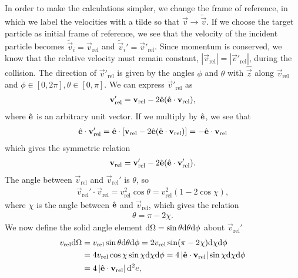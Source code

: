 In order to make the calculations simpler, we change the frame of reference, in which we label the velocities with a tilde so that $\vec v \rightarrow \tilde{\vec v}$. If we choose the target particle as initial frame of reference, we see that the velocity of the incident particle becomes $\tilde {\vec v}_i = \vec v_\text{rel}$ and $\tilde {\vec v}_i' = \vec v'_\text{rel}$. Since momentum is conserved, we know that the relative velocity must remain constant, $|\vec v_\text{rel}| = |\vec v'_\text{rel}|$, during the collision. The direction of $\vec v'_\text{rel}$ is given by the angles $\phi$ and $\theta$ with $\hat {\vec z}$ along $\vec v_\text{rel}$ and $\phi \in [0, 2\pi], \theta \in [0, \pi]$. We can express $\vec v'_\text{rel}$ as
\begin{align}
	\mathbf v_\text{rel}' = \mathbf v_\text{rel} - 2\hat {\mathbf{e}}(\hat {\mathbf{e}}\cdot\mathbf v_\text{rel}),
\end{align}
where $\hat {\mathbf{e}}$ is an arbitrary unit vector. If we multiply by $\hat {\mathbf{e}}$, we see that 
\begin{align}
	\hat {\mathbf{e}}\cdot \mathbf v_\text{rel}' = \hat {\mathbf{e}}\cdot\left[\mathbf v_\text{rel} - 2\hat {\mathbf{e}}(\hat {\mathbf{e}}\cdot\mathbf v_\text{rel})\right] = -\hat {\mathbf{e}} \cdot \mathbf v_\text{rel}
\end{align}
which gives the symmetric relation
\begin{align}
	\mathbf v_\text{rel} = \mathbf v_\text{rel}' - 2\hat {\mathbf{e}}(\hat {\mathbf{e}}\cdot\mathbf v_\text{rel}').
\end{align}
The angle between $\vec v_\text{rel}$ and $\vec v_\text{rel}'$ is $\theta$, so
\begin{align}
	\vec v_\text{rel}'\cdot \vec v_\text{rel} = v_\text{rel}^2\cos\theta = v_\text{rel}^2(1 - 2\cos \chi),
\end{align}
where $\chi$ is the angle between $\hat {\mathbf{e}}$ and $\vec v_\text{rel}$, which gives the relation
\begin{align}
	\theta = \pi - 2\chi.
\end{align}
We now define the solid angle element $\mathrm{d}\Omega=\sin\theta \mathrm{d}\theta \mathrm{d}\phi$ about $\vec v_\text{rel}'$ 
\begin{align}
	v_\text{rel} \mathrm{d}\Omega &= v_\text{rel}\sin\theta \mathrm{d}\theta \mathrm{d}\phi = 2v_\text{rel}\sin(\pi - 2\chi)\mathrm{d}\chi \mathrm{d}\phi\\
	&= 4v_\text{rel}\cos\chi\sin\chi \mathrm{d}\chi \mathrm{d}\phi = 4\left|\hat {\mathbf{e}}\cdot\mathbf v_\text{rel}\right|\sin\chi \mathrm{d}\chi \mathrm{d}\phi\\
	&= 4\left|\hat {\mathbf{e}}\cdot\mathbf v_\text{rel}\right|\mathrm{d}^2e,
\end{align}
